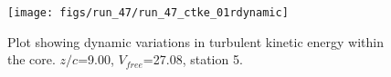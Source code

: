 \begin{figure}[H]
\centering
\texttt{[image: figs/run\_47/run\_47\_ctke\_01rdynamic]}
\caption{Plot showing dynamic variations in turbulent kinetic energy within the core. $z/c$=9.00, $V_{free}$=27.08, station 5.}
\label{fig:run_47_ctke_01rdynamic}
\end{figure}


